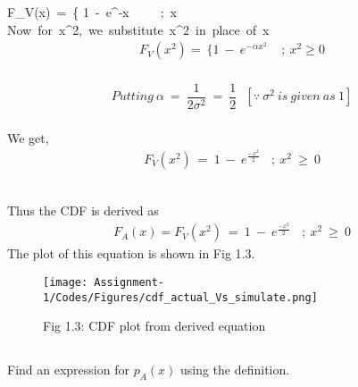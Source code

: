 F_V(x)\ =\ \Bigg\{ 1\ -\ e^{-\alpha x}\ \ \ \ \ ;\ x \\

Now\ for\ x^2,\ we\ substitute\ x^2\ in\ place\ of\ x\\

\begin{align}F_V(x^2) = \ \Bigg\{ 1\ -\ e^{-\alpha x^2}\ \ \ \ \ ;\ x^2 \geq 0\end{align}\\


\begin{align*}Putting\ \alpha\ =\ \dfrac{1}{2\sigma^2}\ =\ \dfrac{1}{2}\ \ \ [\because \ \sigma^2\ is\ given\ as\ 1]\end{align*}\\
We get,\\
\begin{align} F_V(x^2)\ =\ 1\ -\ e^\frac{-x^2}{2}\ \ \ \ ;\ x^2\ \geq\ 0\end{align}\\

\begin{mdframed}
Thus the CDF is derived as\\
\begin{align*} F_A(x) =  F_V(x^2)\ =\ 1\ -\ e^\frac{-x^2}{2}\ \ \ \ ;\ x^2\ \geq\ 0\end{align*}
The plot of this equation is shown in Fig 1.3.
\end{mdframed}
\begin{figure}[h!]
    \centering
    \texttt{[image: Assignment-1/Codes/Figures/cdf\_actual\_Vs\_simulate.png]}
    \caption*{Fig 1.3: CDF plot from derived equation}
\end{figure}
\subsection*{}
Find an expression for $p_A(x)$ using the definition.

\subsection*{}\\

